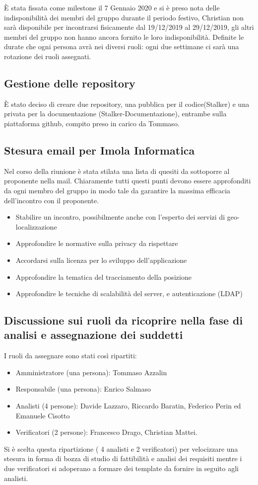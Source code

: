 È stata fissata come milestone il 7 Gennaio 2020 e si è preso nota delle indisponibilità dei membri del gruppo durante il periodo festivo, Christian non sarà disponibile per incontrarsi fisicamente dal 19/12/2019 al 29/12/2019, gli altri membri del gruppo non hanno ancora fornito le loro indisponibilità. 
Definite le durate che ogni persona avrà nei diversi ruoli: ogni due settimane ci sarà una rotazione dei ruoli assegnati. \\

\subsection{Gestione delle repository}
È stato deciso di creare due repository, una pubblica per il codice(Stalker) e una privata per la documentazione (Stalker-Documentazione), entrambe sulla piattaforma github, compito preso in carico da Tommaso. \\

\subsection{Stesura email per Imola Informatica}
Nel corso della riunione è stata stilata una lista di quesiti da sottoporre al proponente nella mail. 
Chiaramente tutti questi punti devono essere approfonditi da ogni membro del gruppo in modo tale da garantire la massima efficacia dell'incontro con il proponente.
\begin{itemize}
\item Stabilire un incontro, possibilmente anche con l’esperto dei servizi di geo-localizzazione
\item Approfondire le normative sulla privacy da rispettare
\item Accordarsi sulla licenza per lo sviluppo dell'applicazione
\item Approfondire la tematica del tracciamento della posizione
\item Approfondire le tecniche di scalabilità del server, e autenticazione (LDAP)
\end{itemize} 

\subsection{ Discussione sui ruoli da ricoprire nella fase di analisi e assegnazione dei suddetti}
I ruoli da assegnare sono stati così ripartiti: 
\begin{itemize}
\item Amministratore (una persona): Tommaso Azzalin
\item Responsabile (una persona): Enrico Salmaso
\item Analisti (4 persone): Davide Lazzaro, Riccardo Baratin, Federico Perin ed Emanuele Cisotto
\item Verificatori (2 persone): Francesco Drago, Christian Mattei.
\end{itemize}
Si è scelta questa ripartizione ( 4 analisti e 2 verificatori) per velocizzare una stesura in forma di 
bozza di studio di fattibilità e analisi dei requisiti mentre i due verificatori si adoperano a formare dei template
da fornire in seguito agli analisti.
\\
